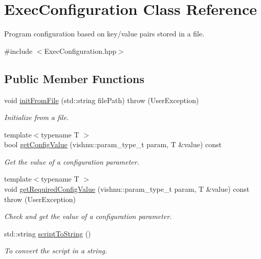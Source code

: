 \hypertarget{classExecConfiguration}{
\section{ExecConfiguration Class Reference}
\label{classExecConfiguration}
}


Program configuration based on key/value pairs stored in a file.  




{\ttfamily \#include $<$ExecConfiguration.hpp$>$}

\subsection*{Public Member Functions}
\begin{DoxyCompactItemize}
\item 
void \hyperlink{classExecConfiguration_acc0689c976ae6c48f88b3156bea802c1}{initFromFile} (std::string filePath)  throw (UserException)
\begin{DoxyCompactList}\small\item\em Initialize from a file. \item\end{DoxyCompactList}\item 
{\footnotesize template$<$typename T $>$ }\\bool \hyperlink{classExecConfiguration_a6642ffe0f41262c3b0188723c2c7ee14}{getConfigValue} (vishnu::param\_\-type\_\-t param, T \&value) const 
\begin{DoxyCompactList}\small\item\em Get the value of a configuration parameter. \item\end{DoxyCompactList}\item 
{\footnotesize template$<$typename T $>$ }\\void \hyperlink{classExecConfiguration_abbfae5b4cf60595866016107c66e02ee}{getRequiredConfigValue} (vishnu::param\_\-type\_\-t param, T \&value) const   throw (UserException)
\begin{DoxyCompactList}\small\item\em Check and get the value of a configuration parameter. \item\end{DoxyCompactList}\item 
\hypertarget{classExecConfiguration_a051728d6c1118fa523ac71e6b64abecc}{
std::string \hyperlink{classExecConfiguration_a051728d6c1118fa523ac71e6b64abecc}{scriptToString} ()}
\label{classExecConfiguration_a051728d6c1118fa523ac71e6b64abecc}

\begin{DoxyCompactList}\small\item\em To convert the script in a string. \item\end{DoxyCompactList}\end{DoxyCompactItemize}
